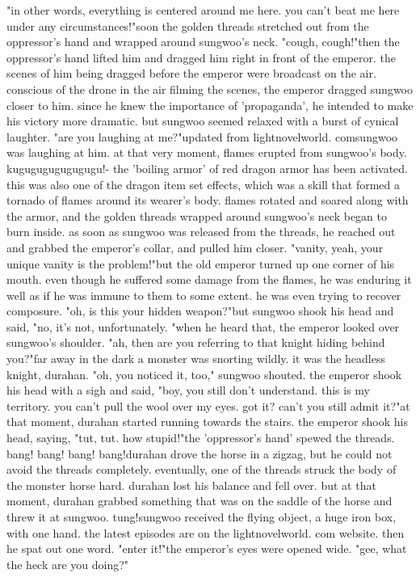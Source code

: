 "in other words, everything is centered around me here.
 you can't beat me here under any circumstances!"soon the golden threads stretched out from the oppressor's hand and wrapped around sungwoo's neck.
"cough, cough!"then the oppressor's hand lifted him and dragged him right in front of the emperor.
 the scenes of him being dragged before the emperor were broadcast on the air.
conscious of the drone in the air filming the scenes, the emperor dragged sungwoo closer to him.
 since he knew the importance of 'propaganda', he intended to make his victory more dramatic.
but sungwoo seemed relaxed with a burst of cynical laughter.
 "are you laughing at me?"updated from lightnovelworld.
comsungwoo was laughing at him.
 at that very moment, flames erupted from sungwoo's body.
kugugugugugugugu!- the 'boiling armor' of red dragon armor has been activated.
this was also one of the dragon item set effects, which was a skill that formed a tornado of flames around its wearer's body.
 flames rotated and soared along with the armor, and the golden threads wrapped around sungwoo's neck began to burn inside.
 as soon as sungwoo was released from the threads, he reached out and grabbed the emperor's collar, and pulled him closer.
"vanity, yeah, your unique vanity is the problem!"but the old emperor turned up one corner of his mouth.
 even though he suffered some damage from the flames, he was enduring it well as if he was immune to them to some extent.
 he was even trying to recover composure.
"oh, is this your hidden weapon?"but sungwoo shook his head and said, "no, it's not, unfortunately.
"when he heard that, the emperor looked over sungwoo's shoulder.
"ah, then are you referring to that knight hiding behind you?"far away in the dark a monster was snorting wildly.
 it was the headless knight, durahan.
"oh, you noticed it, too," sungwoo shouted.
the emperor shook his head with a sigh and said, "boy, you still don't understand.
 this is my territory.
 you can't pull the wool over my eyes.
 got it? can't you still admit it?"at that moment, durahan started running towards the stairs.
 the emperor shook his head, saying, "tut, tut.
 how stupid!"the 'oppressor's hand' spewed the threads.
bang! bang! bang! bang!durahan drove the horse in a zigzag, but he could not avoid the threads completely.
eventually, one of the threads struck the body of the monster horse hard.
 durahan lost his balance and fell over.
 but at that moment, durahan grabbed something that was on the saddle of the horse and threw it at sungwoo.
tung!sungwoo received the flying object, a huge iron box, with one hand.
 the latest episodes are on the lightnovelworld.
com website.
then he spat out one word.
"enter it!"the emperor's eyes were opened wide.
"gee, what the heck are you doing?"

